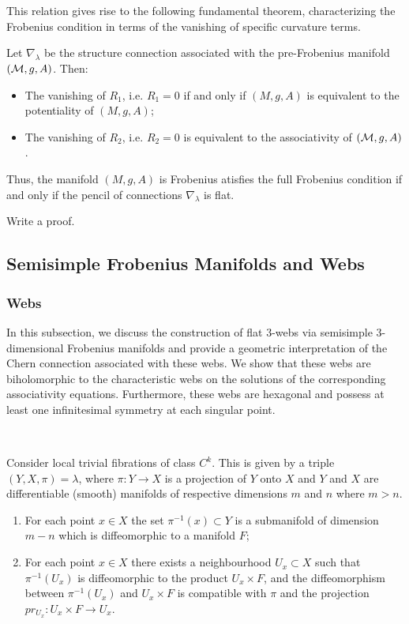 This relation gives rise to the following fundamental theorem, characterizing the Frobenius condition in terms of the vanishing of specific curvature terms.
\begin{theorem}
Let $\nabla_\lambda$ be the structure connection associated with the pre-Frobenius manifold $(\mathcal{M}, g, A)$. Then:
\begin{itemize}
    \item  The vanishing of $R_1$, i.e. $R_1 = 0$ if and only if $(M, g, A)$ is equivalent to the potentiality of $(M, g, A)$;
    \item The vanishing of $R_2$, i.e. $R_2 = 0$ is equivalent to the associativity of $(\mathcal{M}, g, A)$.
\end{itemize}
Thus, the manifold $(M, g, A)$ is Frobenius atisfies the full Frobenius condition if and only if the pencil of connections $\nabla_\lambda$ is flat.
\end{theorem}
\begin{ex}\label{Ex:Manin2}
    Write a proof. 
\end{ex}

\subsection{Semisimple Frobenius Manifolds and Webs}
\subsubsection{Webs}
In this subsection, we discuss the construction of flat $3$-webs via semisimple $3$-dimensional Frobenius manifolds and provide a geometric interpretation of the Chern connection associated with these webs. We show that these webs are biholomorphic to the characteristic webs on the solutions of the corresponding associativity equations. Furthermore, these webs are hexagonal and possess at least one infinitesimal symmetry at each singular point.

\, 

Consider local trivial fibrations of class $C^k$. This is given by a triple $(Y,X,\pi)=\lambda$, where $\pi:Y\to X$  is a projection of $Y$ onto $X$ and $Y$ and $X$ are differentiable (smooth) manifolds of respective dimensions $m$ and $n$ where $m > n$. 
\begin{enumerate}
    \item For each point $x \in X$ the set $\pi^{-1}(x)\subset Y$ is a submanifold of dimension $m-n$ which is diffeomorphic to a manifold $F$;
 \item For each point $x \in X$ there exists a neighbourhood $U_x\subset X$ such that $\pi^{-1}(U_x)$ is diffeomorphic to the product $U_x \times F$, and the diffeomorphism between $\pi^{-1}(U_x)$ and  $U_x \times F$  is compatible with $\pi$ and the projection $pr_{U_x} : U_x \times F \to U_x$.
\end{enumerate}

